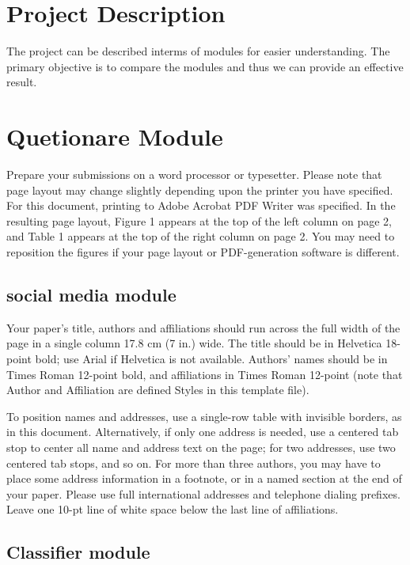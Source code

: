 \documentclass{chi2009}
\begin{document}
\begin{Abstract}
\section{Project Description}

The project can be described interms of modules for easier understanding. The primary objective is to compare the modules and thus we can provide an effective result. 


\section{Quetionare Module}

Prepare your submissions on a word processor or typesetter.  Please
note that page layout may change slightly depending upon the printer
you have specified.  For this document, printing to Adobe Acrobat PDF
Writer was specified.  In the resulting page layout, Figure 1 appears
at the top of the left column on page 2, and Table 1 appears at the
top of the right column on page 2.  You may need to reposition the
figures if your page layout or PDF-generation software is different.

\subsection{social media module}

Your paper's title, authors and affiliations should run across the
full width of the page in a single column 17.8 cm (7 in.) wide.  The
title should be in Helvetica 18-point bold; use Arial if Helvetica is
not available.  Authors' names should be in Times Roman 12-point bold,
and affiliations in Times Roman 12-point (note that Author and
Affiliation are defined Styles in this template file).

To position names and addresses, use a single-row table with invisible
borders, as in this document.  Alternatively, if only one address is
needed, use a centered tab stop to center all name and address text on
the page; for two addresses, use two centered tab stops, and so
on. For more than three authors, you may have to place some address
information in a footnote, or in a named section at the end of your
paper. Please use full international addresses and telephone dialing
prefixes.  Leave one 10-pt line of white space below the last line of
affiliations.

\subsection{Classifier module}


\end{Abstract}
\end{document}
